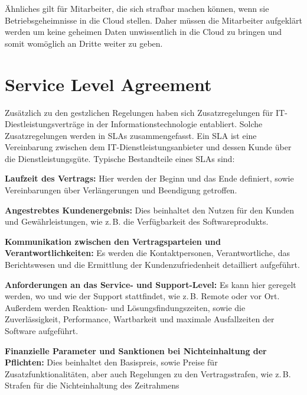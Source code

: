 \"Ahnliches gilt f\"ur Mitarbeiter, die sich strafbar machen k\"onnen, wenn sie Betriebsgeheimnisse in die Cloud stellen. Daher m\"ussen die Mitarbeiter aufgekl\"art werden um keine geheimen Daten unwissentlich in die Cloud zu bringen und somit wom\"oglich an Dritte weiter zu geben.

\section{Service Level Agreement}
Zus\"atzlich zu den gestzlichen Regelungen haben sich  Zusatzregelungen  f\"ur IT-Diestleistungsvertr\"age in der Informationstechnologie entabliert. Solche Zusatzregelungen werden in SLAs zusammengefasst.
Ein SLA ist eine Vereinbarung zwischen dem IT-Dienstleistungsanbieter und dessen Kunde \"uber die Dienstleistungsg\"ute.\newline
Typische Bestandteile eines SLAs sind:
\begin{seList}
\item \textbf{Laufzeit des Vertrags:}\newline
Hier werden der Beginn und das Ende definiert, sowie Vereinbarungen \"uber Verl\"angerungen und Beendigung getroffen.
\item \textbf{Angestrebtes Kundenergebnis:}\newline
Dies beinhaltet den Nutzen f\"ur den Kunden und Gew\"ahrleistungen, wie z.\,B. die Verf\"ugbarkeit des Softwareprodukts.
\item \textbf{Kommunikation zwischen den Vertragsparteien und Verantwortlichkeiten:}\newline	
Es werden die Kontaktpersonen, Verantwortliche, das Berichtswesen und die Ermittlung der Kundenzufriedenheit detailliert aufgef\"uhrt.
\item \textbf{Anforderungen an das Service- und Support-Level:}\newline	
Es kann hier geregelt werden, wo und wie der Support stattfindet, wie z.\,B. Remote oder vor Ort. Au{\ss}erdem werden Reaktion- und L\"osungsfindungszeiten, sowie die Zuverl\"assigkeit, Performance, Wartbarkeit und maximale Ausfallzeiten der Software aufgef\"uhrt.
\item \textbf{Finanzielle Parameter und Sanktionen bei Nichteinhaltung der Pflichten:}\newline	
Dies beinhaltet den Basispreis, sowie Preise f\"ur Zusatzfunktionalit\"aten, aber auch Regelungen zu den Vertragsstrafen, wie z.\,B. Strafen f\"ur die Nichteinhaltung des Zeitrahmens
\end{seList}

